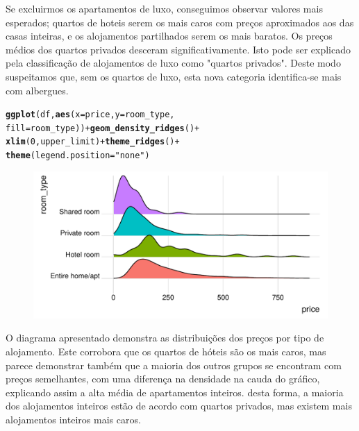 \documentclass[justified, 11pt]{scrartcl}\usepackage[]{graphicx}\usepackage[]{xcolor}
\makeatletter
\def\maxwidth{ %
  \ifdim\Gin@nat@width>\linewidth
    \linewidth
  \else
    \Gin@nat@width
  \fi
}
\newcommand{\hlnum}[1]{\textcolor[rgb]{0.686,0.059,0.569}{#1}}%
\newcommand{\hlstr}[1]{\textcolor[rgb]{0.192,0.494,0.8}{#1}}%
\newcommand{\hlopt}[1]{\textcolor[rgb]{0,0,0}{#1}}%
\newcommand{\hlstd}[1]{\textcolor[rgb]{0.345,0.345,0.345}{#1}}%
\newcommand{\hlkwc}[1]{\textcolor[rgb]{0.333,0.667,0.333}{#1}}%
\newcommand{\hlkwd}[1]{\textcolor[rgb]{0.737,0.353,0.396}{\textbf{#1}}}%
\newenvironment{kframe}{%
 \def\at@end@of@kframe{}%
 \ifinner\ifhmode%
  \def\at@end@of@kframe{\end{minipage}}%
  \begin{minipage}{\columnwidth}%
 \fi\fi%
 \def\FrameCommand##1{\hskip\@totalleftmargin \hskip-\fboxsep
 \colorbox{shadecolor}{##1}\hskip-\fboxsep
     \hskip-\linewidth \hskip-\@totalleftmargin \hskip\columnwidth}%
 \MakeFramed {\advance\hsize-\width
   \@totalleftmargin\z@ \linewidth\hsize
   \@setminipage}}%
 {\par\unskip\endMakeFramed%
 \at@end@of@kframe}
\newenvironment{knitrout}{}{} %
\makeatother
\begin{document}
Se excluirmos os apartamentos de luxo, conseguimos observar valores mais esperados; quartos de hoteis serem os mais caros com preços aproximados aos das casas inteiras, e os alojamentos partilhados serem os mais baratos. Os preços médios dos quartos privados desceram significativamente. Isto pode ser explicado pela classificação de alojamentos de luxo como "quartos privados". Deste modo suspeitamos que, sem os quartos de luxo, esta nova categoria identifica-se mais com albergues.\\

\begin{knitrout}
\color{fgcolor}\begin{kframe}
\begin{alltt}
\hlkwd{ggplot}\hlstd{(df,} \hlkwd{aes}\hlstd{(}\hlkwc{x} \hlstd{= price,} \hlkwc{y} \hlstd{= room_type,}
  \hlkwc{fill} \hlstd{= room_type))} \hlopt{+} \hlkwd{geom_density_ridges}\hlstd{()} \hlopt{+}
  \hlkwd{xlim}\hlstd{(}\hlnum{0}\hlstd{, upper_limit)} \hlopt{+} \hlkwd{theme_ridges}\hlstd{()} \hlopt{+}
  \hlkwd{theme}\hlstd{(}\hlkwc{legend.position} \hlstd{=} \hlstr{"none"}\hlstd{)}
\end{alltt}


{\ttfamily\noindent\itshape\color{messagecolor}{\#\# Picking joint bandwidth of 24.6}}\end{kframe}\begin{figure}
\includegraphics[width=\maxwidth]{figure/chunk-RoomTypesPrice-1} \end{figure}

\end{knitrout}

O diagrama apresentado demonstra as distribuições dos preços por tipo de alojamento. Este corrobora que os quartos de hóteis são os mais caros, mas parece demonstrar também que a maioria dos outros grupos se encontram com preços semelhantes, com uma diferença na densidade na cauda do gráfico, explicando assim a alta média de apartamentos inteiros. desta forma, a maioria dos alojamentos inteiros estão de acordo com quartos privados, mas existem mais alojamentos inteiros mais caros.
\end{document}
